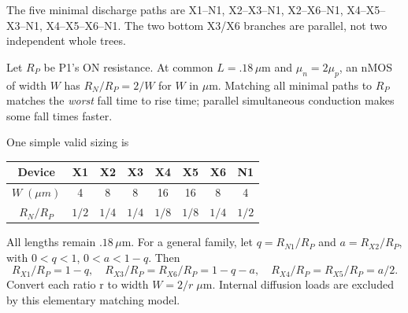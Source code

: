 \documentclass[10pt]{article}
\begin{document}
The five minimal discharge paths are X1--N1, X2--X3--N1, X2--X6--N1, X4--X5--X3--N1, X4--X5--X6--N1. The two bottom X3/X6 branches are parallel, not two independent whole trees.

Let $R_P$ be P1's ON resistance. At common $L=.18\,\mu$m and $\mu_n=2\mu_p$, an nMOS of width $W$ has $R_N/R_P=2/W$ for $W$ in $\mu$m. Matching all minimal paths to $R_P$ matches the \emph{worst} fall time to rise time; parallel simultaneous conduction makes some fall times faster.

One simple valid sizing is
\begin{center}\begin{tabular}{cccccccc}\toprule Device&X1&X2&X3&X4&X5&X6&N1\\\midrule
$W\;(\mu m)$&4&8&8&16&16&8&4\\
$R_N/R_P$&$1/2$&$1/4$&$1/4$&$1/8$&$1/8$&$1/4$&$1/2$\\\bottomrule\end{tabular}\end{center}
All lengths remain $.18\,\mu$m. For a general family, let $q=R_{N1}/R_P$ and $a=R_{X2}/R_P$, with $0<q<1$, $0<a<1-q$. Then
\[R_{X1}/R_P=1-q,\quad R_{X3}/R_P=R_{X6}/R_P=1-q-a,\quad R_{X4}/R_P=R_{X5}/R_P=a/2.\]
Convert each ratio r to width $W=2/r\;\mu$m. Internal diffusion loads are excluded by this elementary matching model.
\end{document}
